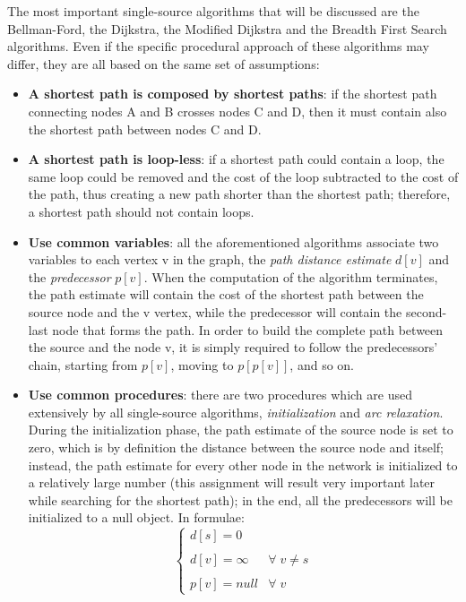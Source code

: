 \documentclass[10pt,a4paper]{report}
\begin{document}
The most important single-source algorithms that will be discussed are
the Bellman-Ford, the Dijkstra, the Modified Dijkstra and the Breadth
First Search algorithms. Even if the specific procedural approach of
these algorithms may differ, they are all based on the same set of
assumptions:
\begin{itemize}
\item \textbf{A shortest path is composed by shortest paths}: if the
  shortest path connecting nodes A and B crosses nodes C and D, then
  it must contain also the shortest path between nodes C and D.
\item \textbf{A shortest path is loop-less}: if a shortest path could
  contain a loop, the same loop could be removed and the cost of the
  loop subtracted to the cost of the path, thus creating a new path
  shorter than the shortest path; therefore, a shortest path should
  not contain loops. 
\item \textbf{Use common variables}: all the aforementioned algorithms
  associate two variables to each vertex v in the graph, the
  \textit{path distance estimate} \(d[v]\) and the
  \textit{predecessor} \(p[v]\). When the computation of the algorithm
  terminates, the path estimate will contain the cost of the shortest
  path between the source node and the v vertex, while the predecessor
  will contain the second-last node that forms the path. In order to
  build the complete path between the source and the node v, it is
  simply required to follow the predecessors' chain, starting from
  \(p[v]\), moving to \(p[p[v]]\), and so on.
\item \textbf{Use common procedures}: there are two procedures which
  are used extensively by all single-source algorithms,
  \textit{initialization} and \textit{arc relaxation}. During the
  initialization phase, the path estimate of the source node is set to
  zero, which is by definition the distance between the source node
  and itself; instead, the path estimate for every other node in the
  network is initialized to a relatively large number (this assignment
  will result very important later while searching for the shortest
  path); in the end, all the predecessors will be initialized to a
  null object. In formulae:
  \[ \left\{
    \begin{array}{ll}
      d[s] = 0 & \\\\
      d[v] = \infty & \forall \; v \neq s \\\\
      p[v] = null & \forall \; v
    \end{array}\right. \]
    

\end{itemize}
\end{document}
